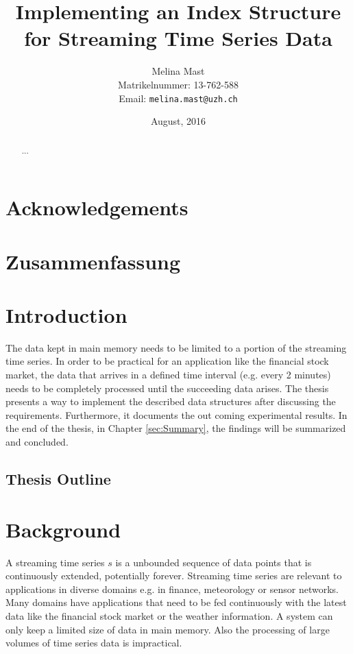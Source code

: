 \documentclass[abstracton,12pt]{scrreprt}
\title{Implementing an Index Structure for Streaming Time Series Data}
\author{
  Melina Mast\\[-5pt]
  \scriptsize Matrikelnummer: 13-762-588\\[-5pt]
  \scriptsize Email: \texttt{melina.mast@uzh.ch}
}
\date{\vspace*{2cm}August, 2016}
\begin{document}
\maketitle

\chapter*{Acknowledgements}



\begin{abstract}
  ...
\end{abstract}

\chapter*{Zusammenfassung}

\tableofcontents
\listoffigures
\listoftables
\listofalgorithms
\renewcommand{\lstlistingname}{Algorithm}%



\chapter{Introduction}

The data kept in main memory needs to be limited to a portion of the streaming time series. In order to be practical for an application like the financial stock market, the data that arrives in a defined time interval (e.g. every 2 minutes) needs to be completely processed until the succeeding data arises.
The thesis presents a way to implement the described data structures after discussing the requirements. Furthermore, it documents the out coming experimental results.
In the end of the thesis, in Chapter \ref{sec:Summary}, the findings will be summarized and concluded.

\section{Thesis Outline}


\newtheorem{defn}{Definition}[section]
\newtheorem{exmp}{Example}[section]
\newcommand*{\argmin}{\operatornamewithlimits{argmin}\limits}

\chapter{Background}
\label{background}
A streaming time series $s$ is a unbounded sequence of data points that is continuously extended, potentially forever. Streaming time series are relevant to applications in diverse domains e.g. in finance, meteorology or sensor networks. Many domains have applications that need to be fed continuously with the latest data like the financial stock market or the weather information. A system can only keep a limited size of data in main memory. Also the processing of large volumes of time series data is impractical.
\end{document}
